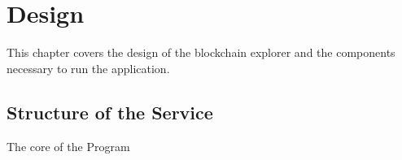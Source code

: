 \chapter{Design}
This chapter covers the design of the blockchain explorer and the components necessary to run the application.

\section{Structure of the Service}
The core of the Program